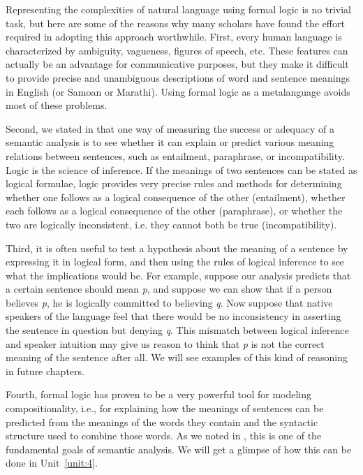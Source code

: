 Representing the complexities of natural language using formal logic is no trivial task, but here are some of the reasons why many scholars have found the effort required in adopting this approach worthwhile. First, every human language is characterized by ambiguity, vagueness, figures of speech, etc. These features can actually be an advantage for communicative purposes, but they make it difficult to provide precise and unambiguous descriptions of word and sentence meanings in English (or Samoan or Marathi). Using formal logic as a metalanguage avoids most of these problems.



Second, we stated in  that one way of measuring the success or adequacy of a semantic analysis is to see whether it can explain or predict various meaning relations between sentences, such as entailment, paraphrase, or incompatibility. Logic is the science of inference. If the meanings of two sentences can be stated as logical formulae, logic provides very precise rules and methods for determining whether one follows as a logical consequence of the other (entailment), whether each follows as a logical consequence of the other (paraphrase), or whether the two are logically inconsistent, i.e. they cannot both be true (incompatibility).



Third, it is often useful to test a hypothesis about the meaning of a sentence by expressing it in logical form, and then using the rules of logical inference to see what the implications would be. For example, suppose our analysis predicts that a certain sentence should mean \textit{p}, and suppose we can show that if a person believes \textit{p}, he is logically committed to believing \textit{q}. Now suppose that native speakers of the language feel that there would be no inconsistency in asserting the sentence in question but denying \textit{q}. This mismatch between logical inference and speaker intuition may give us reason to think that \textit{p} is not the correct meaning of the sentence after all. We will see examples of this kind of reasoning in future chapters.



Fourth, formal logic has proven to be a very powerful tool for modeling compositionality, i.e., for explaining how the meanings of sentences can be predicted from the meanings of the words they contain and the syntactic structure used to combine those words. As we noted in , this is one of the fundamental goals of semantic analysis. We will get a glimpse of how this can be done in Unit~\ref{unit:4}.



